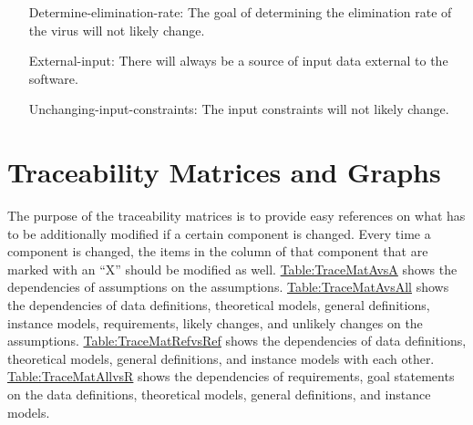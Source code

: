 \documentclass[12pt]{article}
\begin{document}
\begin{itemize}
\item[Determine-elimination-rate:\phantomsection\label{detElimRate}]{The goal of determining the elimination rate of the virus will not likely change.}
\item[External-input:\phantomsection\label{externalInput}]{There will always be a source of input  data external to the software.}
\item[Unchanging-input-constraints:\phantomsection\label{inConstraints}]{The input constraints will not  likely change.}
\end{itemize}
\section{Traceability Matrices and Graphs}
\label{Sec:TraceMatrices}
The purpose of the traceability matrices is to provide easy references on what has to be additionally modified if a certain component is changed. Every time a component is changed, the items in the column of that component that are marked with an ``X'' should be modified as well. \hyperref[Table:TraceMatAvsA]{Table:TraceMatAvsA} shows the dependencies of assumptions on the assumptions. \hyperref[Table:TraceMatAvsAll]{Table:TraceMatAvsAll} shows the dependencies of data definitions, theoretical models, general definitions, instance models, requirements, likely changes, and unlikely changes on the assumptions. \hyperref[Table:TraceMatRefvsRef]{Table:TraceMatRefvsRef} shows the dependencies of data definitions, theoretical models, general definitions, and instance models with each other. \hyperref[Table:TraceMatAllvsR]{Table:TraceMatAllvsR} shows the dependencies of requirements, goal statements on the data definitions, theoretical models, general definitions, and instance models.
\end{document}
